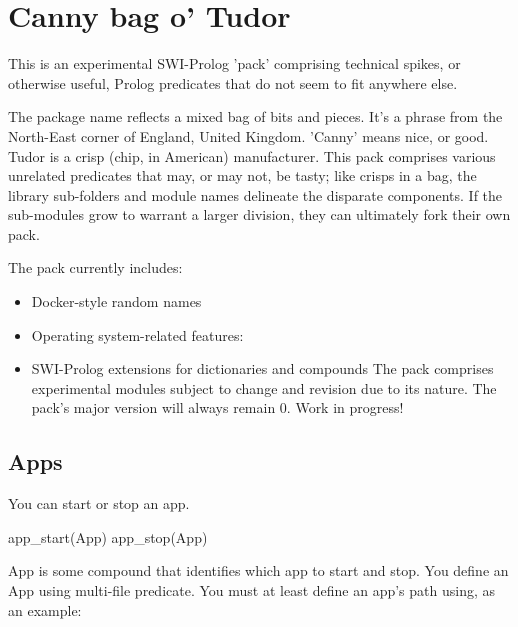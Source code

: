 
\chapter{Canny bag o' Tudor}

This is an experimental SWI-Prolog 'pack' comprising technical spikes, or
otherwise useful, Prolog predicates that do not seem to fit anywhere else.

The package name reflects a mixed bag of bits and pieces. It's a phrase from the
North-East corner of England, United Kingdom. 'Canny' means nice, or good. Tudor
is a crisp (chip, in American) manufacturer. This pack comprises various
unrelated predicates that may, or may not, be tasty; like crisps in a bag, the
library sub-folders and module names delineate the disparate components. If the
sub-modules grow to warrant a larger division, they can ultimately fork their
own pack.

The pack currently includes:

\begin{itemize}
    \item Docker-style random names
    \item Operating system-related features:


    \item SWI-Prolog extensions for dictionaries and compounds
The pack comprises experimental modules subject to change and revision
due to its nature. The pack's major version will always remain 0.
Work in progress!
\end{itemize}

\section{Apps}

You can start or stop an app.

\begin{code}
app_start(App)
app_stop(App)
\end{code}

App is some compound that identifies which app to start and stop. You define an
App using  multi-file predicate. You must at least define
an app's path using, as an example:

